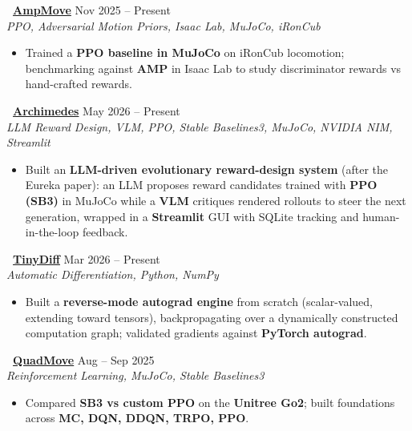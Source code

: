 \documentclass[letterpaper,10.5pt]{article}
\newcommand{\ghlink}[2]{\faGithub\ \href{#1}{#2}}
\begin{document}
\noindent\textbf{\ghlink{https://github.com/gg21-prog/ampmove}{AmpMove}} \hfill Nov 2025 -- Present \\
\textit{PPO, Adversarial Motion Priors, Isaac Lab, MuJoCo, iRonCub}
\begin{itemize}[leftmargin=*,itemsep=0.3pt,topsep=0.8pt,parsep=0pt]
    \item Trained a \textbf{PPO baseline in MuJoCo} on iRonCub locomotion; benchmarking against \textbf{AMP} in Isaac Lab to study discriminator rewards vs hand-crafted rewards.
\end{itemize}

\vspace{1pt}

\noindent\textbf{\ghlink{https://github.com/advait2211/archimedes}{Archimedes}} \hfill May 2026 -- Present \\
\textit{LLM Reward Design, VLM, PPO, Stable Baselines3, MuJoCo, NVIDIA NIM, Streamlit}
\begin{itemize}[leftmargin=*,itemsep=0.3pt,topsep=0.8pt,parsep=0pt]
    \item Built an \textbf{LLM-driven evolutionary reward-design system} (after the Eureka paper): an LLM proposes reward candidates trained with \textbf{PPO (SB3)} in MuJoCo while a \textbf{VLM} critiques rendered rollouts to steer the next generation, wrapped in a \textbf{Streamlit} GUI with SQLite tracking and human-in-the-loop feedback.
\end{itemize}

\vspace{1pt}

\noindent\textbf{\ghlink{https://github.com/gg21-prog/tinydiff}{TinyDiff}} \hfill Mar 2026 -- Present \\
\textit{Automatic Differentiation, Python, NumPy}
\begin{itemize}[leftmargin=*,itemsep=0.3pt,topsep=0.8pt,parsep=0pt]
    \item Built a \textbf{reverse-mode autograd engine} from scratch (scalar-valued, extending toward tensors), backpropagating over a dynamically constructed computation graph; validated gradients against \textbf{PyTorch autograd}.
\end{itemize}

\vspace{1pt}

\noindent\textbf{\ghlink{https://github.com/Advait2211/quad_move_eklavya}{QuadMove}} \hfill Aug -- Sep 2025 \\
\textit{Reinforcement Learning, MuJoCo, Stable Baselines3}
\begin{itemize}[leftmargin=*,itemsep=0.3pt,topsep=0.8pt,parsep=0pt]
    \item Compared \textbf{SB3 vs custom PPO} on the \textbf{Unitree Go2}; built foundations across \textbf{MC, DQN, DDQN, TRPO, PPO}.
\end{itemize}
\end{document}
